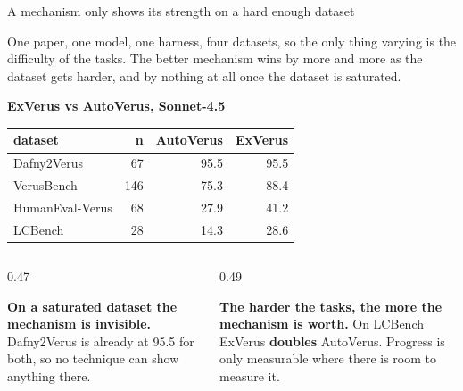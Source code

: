 \documentclass[aspectratio=169,10pt]{beamer}
\newcommand{\hd}[1]{\textbf{\color{lgTeal}#1}}
\newcommand{\good}[1]{{\color{lgGreen}#1}}
\newcommand{\bad}[1]{{\color{lgRed}#1}}
\begin{document}
\begin{frame}{A mechanism only shows its strength on a hard enough dataset}

{\scriptsize
One paper, one model, one harness, four datasets, so the only thing varying is the difficulty
of the tasks. The better mechanism wins by more and more as the dataset gets harder, and by
nothing at all once the dataset is saturated.
}

\vspace{6pt}
\begin{center}
{\scriptsize
\hd{ExVerus vs AutoVerus, Sonnet-4.5}\\[5pt]
\begin{tabular}{lrrr}
\toprule
\textbf{dataset} & \textbf{n} & \textbf{AutoVerus} & \textbf{ExVerus} \\
\midrule
Dafny2Verus      & 67  & 95.5 & \good{95.5} \\
VerusBench       & 146 & 75.3 & 88.4 \\
HumanEval-Verus  & 68  & 27.9 & 41.2 \\
LCBench          & 28  & \bad{14.3} & \bad{28.6} \\
\bottomrule
\end{tabular}
}
\end{center}

\vspace{6pt}
\begin{columns}[T]
\begin{column}{0.47\textwidth}
\begin{callout}[lgGrey]
\scriptsize
\textbf{On a saturated dataset the mechanism is invisible.} Dafny2Verus is already at 95.5 for
both, so no technique can show anything there.
\end{callout}
\end{column}

\begin{column}{0.49\textwidth}
\begin{callout}[lgAccent]
\scriptsize
\textbf{The harder the tasks, the more the mechanism is worth.} On LCBench ExVerus
\textbf{doubles} AutoVerus. Progress is only measurable where there is room to measure it.
\end{callout}
\end{column}
\end{columns}

\end{frame}
\end{document}
